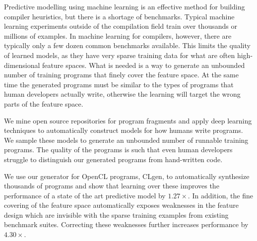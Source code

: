 Predictive modelling using machine learning is an effective method for building compiler heuristics, but there is a shortage of benchmarks. Typical machine learning experiments outside of the compilation field train over thousands or millions of examples. In machine learning for compilers, however, there are typically only a few dozen common benchmarks available. This limits the quality of learned models, as they have very sparse training data for what are often high-dimensional feature spaces. What is needed is a way to generate an unbounded number of training programs that finely cover the feature space. At the same time the generated programs must be similar to the types of programs that human developers actually write, otherwise the learning will  target the wrong parts of the feature space. 

We mine open source repositories for program fragments and apply deep learning techniques to automatically construct models for how humans write programs. We sample these models to generate an unbounded number of runnable training programs. The quality of the programs is such that even human developers struggle to distinguish our generated programs from hand-written code.

We use our generator for OpenCL programs, CLgen, to automatically synthesize thousands of programs and show that learning over these improves the performance of a state of the art predictive model by $1.27\times$. In addition, the fine covering of the feature space automatically exposes weaknesses in the feature design which are invisible with the sparse training examples from existing benchmark suites. Correcting these weaknesses further increases performance by $4.30\times$.

